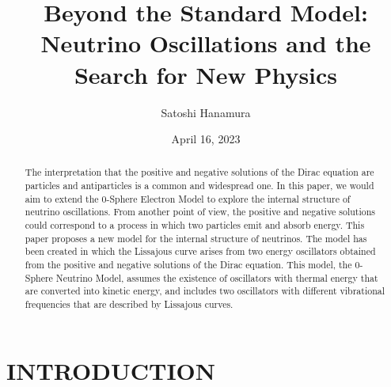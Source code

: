 \documentclass[%
 reprint,
 amsmath,amssymb,
 aps,
]{revtex4-1}
\numberwithin{equation}{section}%
\begin{document}

    \title{Beyond the Standard Model:\\
    Neutrino Oscillations and the Search for New Physics}
    \author{Satoshi Hanamura}
    \date{April 16, 2023}
        \begin{abstract}


 The interpretation that the positive and negative solutions of the Dirac equation are particles and antiparticles is a common and widespread one. In this paper, we would aim to extend the 0-Sphere Electron Model to explore the internal structure of neutrino oscillations. From another point of view, the positive and negative solutions could correspond to a process in which two particles emit and absorb energy. This paper proposes a new model for the internal structure of neutrinos. The model has been created in which the Lissajous curve arises from two energy oscillators obtained from the positive and negative solutions of the Dirac equation. This model, the 0-Sphere Neutrino Model, assumes the existence of oscillators with thermal energy that are converted into kinetic energy, and includes two oscillators with different vibrational frequencies that are described by Lissajous curves. 

        \end{abstract}
    \maketitle




\section{\label{sec:INTRODUCTION}INTRODUCTION}
\end{document}
